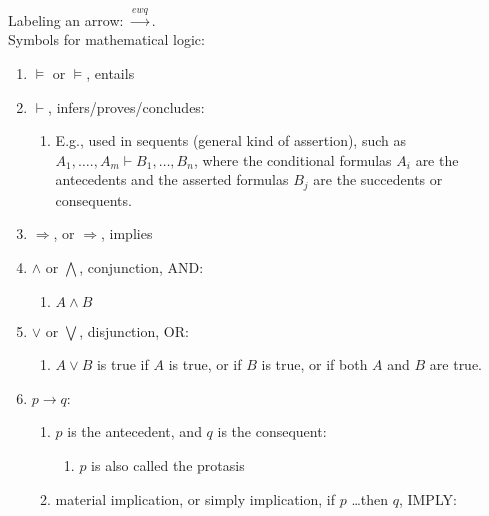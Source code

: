 Labeling an arrow: $\xrightarrow{ewq}$. \\






Symbols for mathematical logic: \vspace{-0.3cm}
\begin{enumerate} \itemsep -4pt
\item $\models$ or $\vDash$, entails
\item $\vdash$, infers/proves/concludes: \vspace{-0.3cm}
	\begin{enumerate} \itemsep -2pt
	\item E.g., used in sequents (general kind of assertion), such as $A_{1}, \dots., A_{m} \vdash B_{1}, \dots, B_{n}$, where the conditional formulas $A_{i}$ are the antecedents and the asserted formulas $B_{j}$ are the succedents or consequents.
	\end{enumerate}
\item $\Rightarrow$, or $\Longrightarrow$, implies
\item $\land$ or $\bigwedge$, conjunction, AND: \vspace{-0.3cm}
	\begin{enumerate} \itemsep -2pt
	\item $A\land B$
	\end{enumerate}
\item $\lor$ or $\bigvee$, disjunction, OR: \vspace{-0.3cm}
	\begin{enumerate} \itemsep -2pt
	\item $A\lor B$ is true if ${\displaystyle A}$ is true, or if ${\displaystyle B}$ is true, or if both ${\displaystyle A}$ and ${\displaystyle B}$ are true.
	\end{enumerate}
\item $p \rightarrow q$: \vspace{-0.3cm}
	\begin{enumerate} \itemsep -2pt
	\item $p$ is the antecedent, and $q$ is the consequent: \vspace{-0.2cm}
		\begin{enumerate} \itemsep -2pt
		\item $p$ is also called the protasis
		\end{enumerate}
	\item material implication, or simply implication, if $p$ \dots then $q$, IMPLY: \vspace{-0.2cm}

\end{enumerate}
\end{enumerate}
